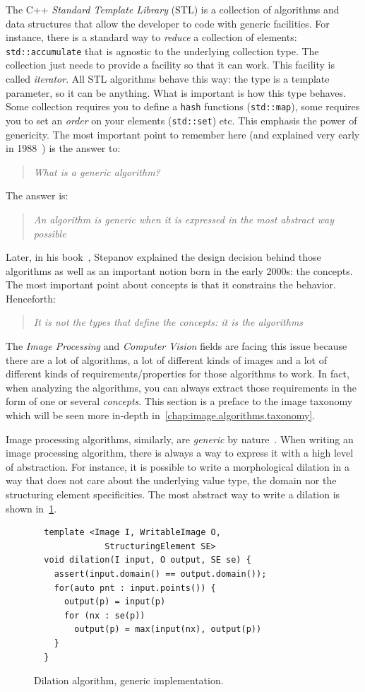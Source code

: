 The C++ \emph{Standard Template Library} (STL) is a collection of algorithms and data structures that allow the
developer to code with generic facilities. For instance, there is a standard way to \emph{reduce} a collection of
elements: \texttt{std::accumulate} that is agnostic to the underlying collection type. The collection just needs to
provide a facility so that it can work. This facility is called \emph{iterator}. All STL algorithms behave this way: the
type is a template parameter, so it can be anything. What is important is how this type behaves. Some collection
requires you to define a \texttt{hash} functions (\texttt{std::map}), some requires you to set an \emph{order} on your
elements (\texttt{std::set}) etc. This emphasis the power of genericity. The most important point to remember here (and
explained very early in 1988~\parencite{musser.1988.generic}) is the answer to: \blockquote{\emph{What is a generic
    algorithm?}}. The answer is: \blockquote{\emph{An algorithm is generic when it is expressed in the most abstract way
    possible}}. Later, in his book~\parencite{stepanov.2009.elements}, Stepanov explained the design decision behind those
algorithms as well as an important notion born in the early 2000s: the concepts. The most important point about concepts
is that it constrains the behavior. Henceforth: \blockquote{\emph{It is not the types that define the concepts: it is
    the algorithms}}. The \emph{Image Processing} and \emph{Computer Vision} fields are facing this issue because there are
a lot of algorithms, a lot of different kinds of images and a lot of different kinds of requirements/properties for
those algorithms to work. In fact, when analyzing the algorithms, you can always extract those requirements in the form
of one or several \emph{concepts}. This section is a preface to the image taxonomy which will be seen more in-depth
in~\cref{chap:image.algorithms.taxonomy}.

Image processing algorithms, similarly, are \emph{generic} by
nature~\parencite{ritter.1990.cvgi,geraud.2000.icpr,darbon.2002.ismm,levillain.2010.icip,levillain.2014.ciarp}. When
writing an image processing algorithm, there is always a way to express it with a high level of abstraction. For
instance, it is possible to write a morphological dilation in a way that does not care about the underlying value type,
the domain nor the structuring element specificities. The most abstract way to write a dilation is shown
in~\cref{code:gen.dilate}.

\begin{figure}[htbp]
  \centering
  \begin{verbatim}
  template <Image I, WritableImage O,
              StructuringElement SE>
  void dilation(I input, O output, SE se) {
    assert(input.domain() == output.domain());
    for(auto pnt : input.points()) {
      output(p) = input(p)
      for (nx : se(p))
        output(p) = max(input(nx), output(p))
    }
  }
  \end{verbatim}
  \caption{Dilation algorithm, generic implementation.}
  \label{code:gen.dilate}
\end{figure}

